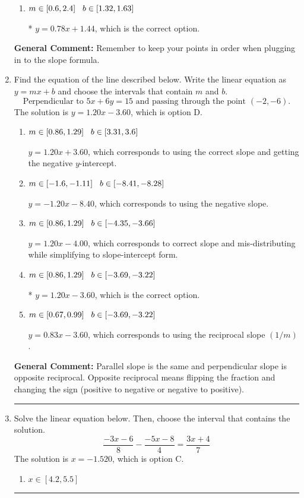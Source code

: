 \documentclass{extbook}[14pt]
\newcommand{\litem}[1]{\item #1

\rule{\textwidth}{0.4pt}}
\begin{document}
\begin{enumerate}
{\begin{enumerate}[label=\Alph*.]
 $y = -0.78x -9.44$, which corresponds to using the negative slope and the correct equation.
\item \( m \in [0.6, 2.4] \hspace*{3mm} b \in [1.32, 1.63] \)

* $y = 0.78x + 1.44$, which is the correct option.
\end{enumerate}

\textbf{General Comment:} Remember to keep your points in order when plugging in to the slope formula.
}
\litem{
Find the equation of the line described below. Write the linear equation as $ y=mx+b $ and choose the intervals that contain $m$ and $b$.
\[ \text{Perpendicular to } 5 x + 6 y = 15 \text{ and passing through the point } (-2, -6). \]The solution is \( y = 1.20x - 3.60 \), which is option D.\begin{enumerate}[label=\Alph*.]
\item \( m \in [0.86, 1.29] \hspace*{3mm} b \in [3.31, 3.6] \)

 $y = 1.20x + 3.60$, which corresponds to using the correct slope and getting the negative $y$-intercept.
\item \( m \in [-1.6, -1.11] \hspace*{3mm} b \in [-8.41, -8.28] \)

 $y = -1.20x - 8.40$, which corresponds to using the negative slope.
\item \( m \in [0.86, 1.29] \hspace*{3mm} b \in [-4.35, -3.66] \)

 $y = 1.20x - 4.00$, which corresponds to correct slope and mis-distributing while simplifying to slope-intercept form.
\item \( m \in [0.86, 1.29] \hspace*{3mm} b \in [-3.69, -3.22] \)

* $y = 1.20x - 3.60$, which is the correct option.
\item \( m \in [0.67, 0.99] \hspace*{3mm} b \in [-3.69, -3.22] \)

 $y = 0.83x - 3.60$, which corresponds to using the reciprocal slope $(1/m)$.
\end{enumerate}

\textbf{General Comment:} Parallel slope is the same and perpendicular slope is opposite reciprocal. Opposite reciprocal means flipping the fraction and changing the sign (positive to negative or negative to positive).
}
\litem{
Solve the linear equation below. Then, choose the interval that contains the solution.
\[ \frac{-3x -6}{8} - \frac{-5x -8}{4} = \frac{3x + 4}{7} \]The solution is \( x = -1.520 \), which is option C.\begin{enumerate}[label=\Alph*.]
\item \( x \in [4.2, 5.5] \)


\end{enumerate}}
\end{enumerate}
\end{document}

